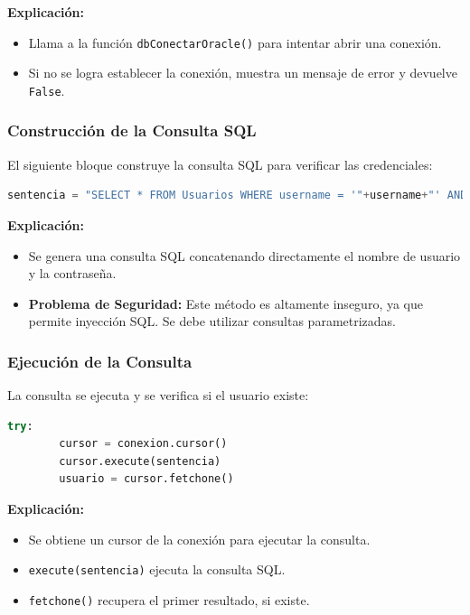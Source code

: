 \documentclass[a4paper,12pt]{article}
\begin{document}
\textbf{Explicación:}
\begin{itemize}
    \item Llama a la función \texttt{dbConectarOracle()} para intentar abrir una conexión.
    \item Si no se logra establecer la conexión, muestra un mensaje de error y devuelve \texttt{False}.
\end{itemize}

\subsubsection{Construcción de la Consulta SQL}
El siguiente bloque construye la consulta SQL para verificar las credenciales:

\begin{lstlisting}[language=Python]
    sentencia = "SELECT * FROM Usuarios WHERE username = '"+username+"' AND password = '"+password+"'"
\end{lstlisting}

\textbf{Explicación:}
\begin{itemize}
    \item Se genera una consulta SQL concatenando directamente el nombre de usuario y la contraseña.
    \item \textbf{Problema de Seguridad:} Este método es altamente inseguro, ya que permite inyección SQL. Se debe utilizar consultas parametrizadas.
\end{itemize}

\subsubsection{Ejecución de la Consulta}
La consulta se ejecuta y se verifica si el usuario existe:

\begin{lstlisting}[language=Python]
    try:
        cursor = conexion.cursor()
        cursor.execute(sentencia)
        usuario = cursor.fetchone()
\end{lstlisting}

\textbf{Explicación:}
\begin{itemize}
    \item Se obtiene un cursor de la conexión para ejecutar la consulta.
    \item \texttt{execute(sentencia)} ejecuta la consulta SQL.
    \item \texttt{fetchone()} recupera el primer resultado, si existe.
\end{itemize}
\end{document}
